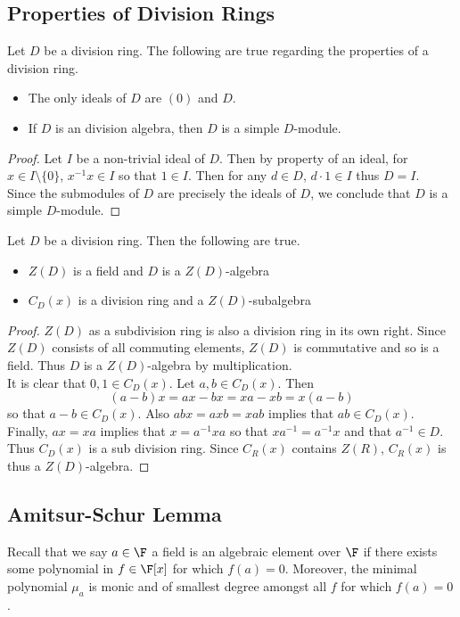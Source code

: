 \documentclass[a4paper]{article}
\begin{document}
\subsection{Properties of Division Rings}
\begin{prp}{}{} Let $D$ be a division ring. The following are true regarding the properties of a division ring. 
\begin{itemize}
\item The only ideals of $D$ are $(0)$ and $D$. 
\item If $D$ is an division algebra, then $D$ is a simple $D$-module. 
\end{itemize} 
\begin{proof}
Let $I$ be a non-trivial ideal of $D$. Then by property of an ideal, for $x\in I\setminus\{0\}$, $x^{-1}x\in I$ so that $1\in I$. Then for any $d\in D$, $d\cdot 1\in I$ thus $D=I$. \\

Since the submodules of $D$ are precisely the ideals of $D$, we conclude that $D$ is a simple $D$-module. 
\end{proof}
\end{prp}

\begin{lmm}{}{} Let $D$ be a division ring. Then the following are true. 
\begin{itemize}
\item $Z(D)$ is a field and $D$ is a $Z(D)$-algebra
\item $C_D(x)$ is a division ring and a $Z(D)$-subalgebra
\end{itemize} 
\begin{proof}
$Z(D)$ as a subdivision ring is also a division ring in its own right. Since $Z(D)$ consists of all commuting elements, $Z(D)$ is commutative and so is a field. Thus $D$ is a $Z(D)$-algebra by multiplication. \\

It is clear that $0,1\in C_D(x)$. Let $a,b\in C_D(x)$. Then $$(a-b)x=ax-bx=xa-xb=x(a-b)$$ so that $a-b\in C_D(x)$. Also $abx=axb=xab$ implies that $ab\in C_D(x)$. Finally, $ax=xa$ implies that $x=a^{-1}xa$ so that $xa^{-1}=a^{-1}x$ and that $a^{-1}\in D$. Thus $C_D(x)$ is a sub division ring. Since $C_R(x)$ contains $Z(R)$, $C_R(x)$ is thus a $Z(D)$-algebra. 
\end{proof}
\end{lmm}

\subsection{Amitsur-Schur Lemma}
Recall that we say $a\in\F$ a field is an algebraic element over $\F$ if there exists some polynomial in $f\in\F[x]$ for which $f(a)=0$. Moreover, the minimal polynomial $\mu_a$ is monic and of smallest degree amongst all $f$ for which $f(a)=0$. 
\end{document}
